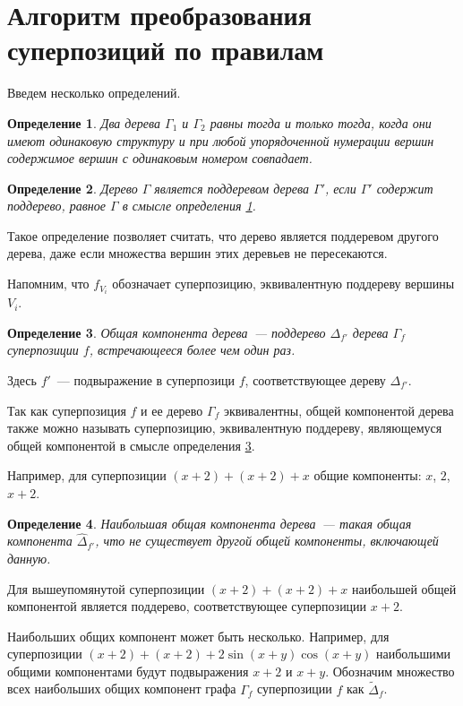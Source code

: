 \documentclass[12pt,a4paper]{article}
\newtheorem{defin}{Определение}
\begin{document}
\section{Алгоритм преобразования суперпозиций по правилам}

Введем несколько определений.

\begin{defin}
  \label{def:tree_equiv}
  Два дерева $\Gamma_1$ и $\Gamma_2$ равны тогда и только тогда, когда они имеют
  одинаковую структуру и при любой упорядоченной нумерации вершин содержимое
  вершин с одинаковым номером совпадает.
\end{defin}

\begin{defin}
  \label{def:tree_subtree}
  Дерево $\Gamma$ является поддеревом дерева $\Gamma'$, если $\Gamma'$ содержит поддерево,
  равное $\Gamma$ в смысле определения \ref{def:tree_equiv}.
\end{defin}
Такое определение позволяет считать, что дерево является поддеревом другого
дерева, даже если множества вершин этих деревьев не пересекаются.

Напомним, что $f_{V_i}$ обозначает суперпозицию, эквивалентную поддереву вершины
$V_i$.

\begin{defin}
  \label{def:common_comp}
  Общая компонента дерева~--- поддерево $\Delta_{f'}$ дерева $\Gamma_f$ суперпозиции $f$,
  встречающееся более чем один раз.
\end{defin}
Здесь $f'$~--- подвыражение в суперпозици $f$, соответствующее дереву
$\Delta_{f'}$.

Так как суперпозиция $f$ и ее дерево $\Gamma_f$ эквивалентны, общей компонентой
дерева также можно называть суперпозицию, эквивалентную поддереву, являющемуся
общей компонентой в смысле определения \ref{def:common_comp}.

Например, для суперпозиции $(x+2)+(x+2)+x$ общие компоненты: $x$, $2$, $x+2$.

\begin{defin}
  \label{def:max_common_comp}
  Наибольшая общая компонента дерева~--- такая общая компонента $\hat{\Delta}_{f'}$, что не
  существует другой общей компоненты, включающей данную.
\end{defin}
Для вышеупомянутой суперпозиции $(x+2)+(x+2)+x$ наибольшей общей компонентой
является поддерево, соответствующее суперпозиции $x+2$.

Наибольших общих компонент может быть несколько. Например, для суперпозиции
$(x+2) + (x+2) + 2 \sin (x + y) \cos (x + y)$ наибольшими общими компонентами
будут подвыражения $x + 2$ и $x + y$. Обозначим множество всех наибольших общих
компонент графа $\Gamma_f$ суперпозиции $f$ как $\tilde{\Delta}_f$.
\end{document}
